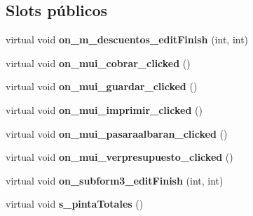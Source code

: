 \subsection*{Slots p\'{u}blicos}
\begin{CompactItemize}
\item 
virtual void {\bf on\_\-m\_\-descuentos\_\-edit\-Finish} (int, int)\label{classPedidoClienteView_i0}

\item 
virtual void {\bf on\_\-mui\_\-cobrar\_\-clicked} ()\label{classPedidoClienteView_i1}

\item 
virtual void {\bf on\_\-mui\_\-guardar\_\-clicked} ()\label{classPedidoClienteView_i2}

\item 
virtual void {\bf on\_\-mui\_\-imprimir\_\-clicked} ()\label{classPedidoClienteView_i3}

\item 
virtual void {\bf on\_\-mui\_\-pasaraalbaran\_\-clicked} ()\label{classPedidoClienteView_i4}

\item 
virtual void {\bf on\_\-mui\_\-verpresupuesto\_\-clicked} ()\label{classPedidoClienteView_i5}

\item 
virtual void {\bf on\_\-subform3\_\-edit\-Finish} (int, int)\label{classPedidoClienteView_i6}

\item 
virtual void {\bf s\_\-pinta\-Totales} ()\label{classPedidoClienteView_i7}

\end{CompactItemize}
